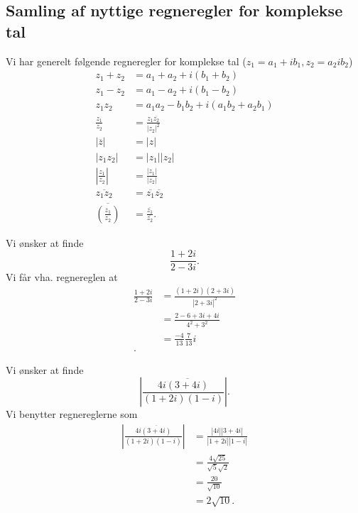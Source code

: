 \subsection{Samling af nyttige regneregler for komplekse tal}
Vi har generelt følgende regneregler for komplekse tal ($z_1 = a_1 + ib_1, z_2 = a_2 ib_2$)
\begin{align*}
  z_1 + z_2 &= a_1 + a_2 + i(b_1 + b_2) \\
  z_1 - z_2 &= a_1 - a_2 + i(b_1 - b_2) \\
  z_1z_2 &=  a_1a_2 - b_1b_2 + i(a_1b_2 + a_2b_1) \\
  \frac{z_1}{z_2} &= \frac{z_1 \overline{z_2}}{|z_2|^2} \\
  |\overline{z}| &= |z| \\
  |z_1z_2| &= |z_1||z_2| \\
  \left| \frac{z_1}{z_2} \right| &= \frac{|z_1|}{|z_2|} \\
  \overline{z_1z_2} &= \overline{z_1} \overline{z_2} \\
  \overline{\left( \frac{z_1}{z_2} \right)} &= \frac{\overline{z_1}}{\overline{z_2}}
.\end{align*}

\begin{eks} 
  Vi ønsker at finde
  \[ 
  \frac{1 +2i}{2-3i}
  .\]
  \bigbreak
  Vi får vha. regnereglen at
  \begin{align*}
    \frac{1+2i}{2-3i} &= \frac{(1+2i)(2+3i)}{|2+3i|^2} \\
    &= \frac{2 - 6 + 3i + 4i}{4^2 + 3^2} \\
    &= \frac{-4}{13} \frac{7}{13}i \\
  .\end{align*}
\end{eks}

\begin{eks} 
  Vi ønsker at finde
  \[ 
  \left| \frac{4i \overline{(3+4i)}}{(1+2i)(1-i)} \right|
  .\]
  Vi benytter regnereglerne som
  \begin{align*}
  \left| \frac{4i \overline{(3+4i)}}{(1+2i)(1-i)} \right| &= \frac{|4i| |3+4i|}{|1+2i||1-i|} \\
  &= \frac{4 \sqrt{25}}{\sqrt{5}\sqrt{2}} \\
  &= \frac{20}{\sqrt{10}} \\
  &= 2 \sqrt{10}
  .\end{align*}
\end{eks}

